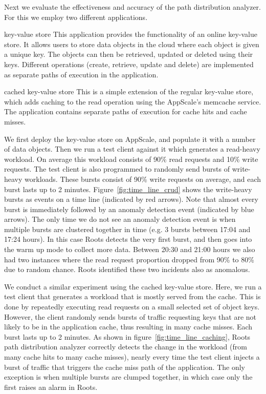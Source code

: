 Next we evaluate the effectiveness and accuracy of the path distribution analyzer. For this we 
employ two different applications.
\begin{LaTeXdescription}
\item[key-value store] This application provides the functionality of an online key-value store.  It allows 
users to store data objects in the cloud where each object is given a unique key. The objects can then be 
retrieved, updated or deleted using their keys. Different operations
(create, retrieve, update and delete) are implemented as separate paths of
execution in the application.
\item[cached key-value store] This is a simple extension of the regular key-value store, which adds
caching to the read operation using the AppScale's memcache service. The application contains
separate paths of execution for cache hits and cache misses.
\end{LaTeXdescription}

We first deploy the key-value store on AppScale, and populate it with a number of data objects. Then we
run a test client against it which generates a read-heavy workload. On average this workload
consists of 90\% read requests and 10\% write requests. The test client
is also programmed to randomly send bursts of write-heavy workloads. These bursts consist
of 90\% write requests on average, and each burst lasts up to 2 minutes. Figure~\ref{fig:time_line_crud}
shows the write-heavy bursts as events on a time line (indicated by red arrows). Note that almost every burst is
immediately followed by an anomaly detection event (indicated by blue arrows). 
The only time we do not see an anomaly detection event is when multiple
bursts are clustered together in time (e.g. 3 bursts between 17:04 and 17:24 hours). In this
case Roots detects the very first burst, and then goes into the warm up mode to collect more data. 
Between 20:30 and 21:00 hours we also
had two instances where the read request proportion dropped from 90\% to 80\% due to random
chance. 
Roots identified these two incidents also as anomalous.

We conduct a similar experiment using the cached key-value store. Here, we run a test client that generates a workload
that is mostly served from the cache. This is done by repeatedly executing read requests on a small
selected set of object keys. However, the client randomly sends bursts of traffic requesting keys that
are not likely to be in the application cache, thus resulting in many cache misses. Each burst
lasts up to 2 minutes. As shown in 
figure~\ref{fig:time_line_caching}, Roots path distribution analyzer correctly detects the change 
in the workload (from many cache hits to many cache misses), nearly every time the test client injects a 
burst of traffic that triggers the cache miss path of the application. The only exception is when
multiple bursts are clumped together, in which case only the first raises an alarm in Roots.

